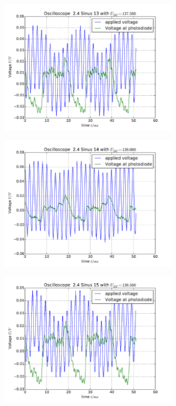 \begin{figure}
\begin{subfigure}[b]{\picwidth}
        \includegraphics[width=\textwidth]{analysis/figures/24sinus13}
        \caption{}
    \end{subfigure}
    \begin{subfigure}[b]{\picwidth}
        \includegraphics[width=\textwidth]{analysis/figures/24sinus14}
        \caption{}
    \end{subfigure}
    \begin{subfigure}[b]{\picwidth}
        \includegraphics[width=\textwidth]{analysis/figures/24sinus15}

\end{subfigure}
\end{figure}
